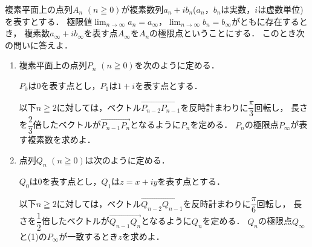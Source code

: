 \documentclass[../../main.tex]{subfiles}
\begin{document}
複素平面上の点列$A_n$ $(n \geqq 0)$が複素数列$a_n+ib_n$($a_n$，$b_n$は実数，$i$は虚数単位)を表すとする．
極限値$\displaystyle \lim_{n \to \infty}a_n=a_{\infty}$，$\displaystyle \lim_{n \to \infty}b_n=b_{\infty}$がともに存在するとき，
複素数$a_{\infty}+ib_{\infty}$を表す点$A_{\infty}$を$A_n$の極限点ということにする．
このとき次の問いに答えよ．
\begin{enumerate}
  \item 複素平面上の点列$P_n$ $(n \geqq 0)$を次のように定める．

    $P_0$は0を表す点とし，$P_1$は$1+i$を表す点とする．

    以下$n \geqq 2$に対しては，ベクトル$\overrightarrow{P_{n-2}P_{n-1}}$を反時計まわりに$\displaystyle\dfrac{\pi}{3}$回転し，
    長さを$\displaystyle\dfrac{2}{3}$倍したベクトルが$\overrightarrow{P_{n-1}P_n}$となるように$P_n$を定める．
    $P_n$の極限点$P_{\infty}$が表す複素数を求めよ．
  \item 点列$Q_n$ $(n \geqq 0)$は次のように定める．

    $Q_0$は0を表す点とし，$Q_1$は$z=x+iy$を表す点とする．

    以下$n \geqq 2$に対しては，ベクトル$\overrightarrow{Q_{n-2}Q_{n-1}}$を反時計まわりに$\displaystyle\dfrac{\pi}{6}$回転し，
    長さを$\displaystyle\dfrac{1}{2}$倍したベクトルが$\overrightarrow{Q_{n-1}Q_n}$となるように$Q_n$を定める．
    $Q_n$の極限点$Q_{\infty}$と(1)の$P_{\infty}$が一致するとき$z$を求めよ．
\end{enumerate}
\end{document}
